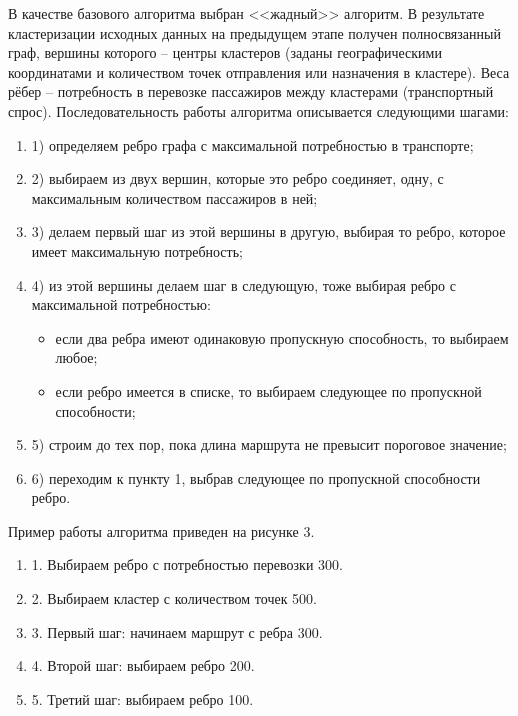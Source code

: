 В качестве базового алгоритма выбран <<жадный>> алгоритм. В результате кластеризации исходных данных на 
предыдущем этапе получен полносвязанный граф, вершины которого -- центры кластеров (заданы географическими 
координатами и количеством точек отправления или назначения в кластере). Веса рёбер -- потребность в 
перевозке пассажиров между кластерами (транспортный спрос). Последовательность работы алгоритма 
описывается следующими шагами:
\begin{enumerate}
    \item 1) определяем ребро графа с максимальной потребностью в транспорте;
    \item 2) выбираем из двух вершин, которые это ребро соединяет, одну, с максимальным количеством 
        пассажиров в ней;
    \item 3) делаем первый шаг из этой вершины в другую, выбирая то ребро, которое имеет максимальную 
        потребность;
    \item 4) из этой вершины делаем шаг в следующую, тоже выбирая ребро с максимальной потребностью:
    \begin{itemize}
        \item если два ребра имеют одинаковую пропускную способность, то выбираем любое;
        \item если ребро имеется в списке, то выбираем следующее по пропускной способности;
    \end{itemize}
    \item 5) строим до тех пор, пока длина маршрута не превысит пороговое значение;
    \item 6) переходим к пункту 1, выбрав следующее по пропускной способности ребро.
\end{enumerate}

Пример работы алгоритма приведен на рисунке 3.
\begin{enumerate}
    \item 1. Выбираем ребро с потребностью перевозки 300.
    \item 2. Выбираем кластер с количеством точек 500.
    \item 3. Первый шаг: начинаем маршрут с ребра 300.
    \item 4. Второй шаг: выбираем ребро 200.
    \item 5. Третий шаг: выбираем ребро 100.
\end{enumerate}

